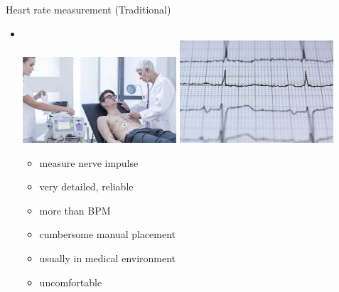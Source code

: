 \documentclass{beamer}
\begin{document}
\begin{frame}{Heart rate measurement (Traditional)}
\begin{itemize}
	\item {}\\
		\vspace{0.2cm}
		\includegraphics[width=0.45\textwidth, height=0.3\paperheight]{ekg.jpg}
		\hfill
		\includegraphics[width=0.45\textwidth, height=0.3\paperheight]{cardiogram.jpg}\\
		\noindent
		\begin{minipage}[t]{0.45\textwidth}
			\begin{itemize}[label=\positiveaspect]
				\item measure nerve impulse \pause
				\item very detailed, reliable \pause
				\item more than BPM \pause
			\end{itemize}
		\end{minipage}
		\hfill\vline\hfill
		\begin{minipage}[t]{0.45\textwidth}
			\begin{itemize}[label=\negativeaspect]
				\item cumbersome manual placement \pause
				\item usually in medical environment \pause
				\item uncomfortable
					
			\end{itemize}
		\end{minipage}
\end{itemize}
\end{frame}
\end{document}
